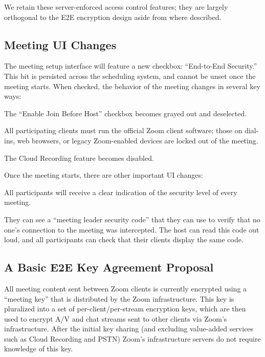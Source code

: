We retain these server-enforced access control features; they are largely orthogonal to the E2E encryption design aside from where described.

\subsection{Meeting UI Changes}

The meeting setup interface will feature a new checkbox: ``End-to-End Security.''  This bit is persisted across the scheduling system, and cannot be unset once the meeting starts. When checked, the behavior of the meeting changes in several key ways:

\begin{itemize*}
\item The ``Enable Join Before Host'' checkbox becomes grayed out and deselected.
\item All participating clients must run the official Zoom client software; those on dial-ins, web browsers, or legacy Zoom-enabled devices are locked out of the meeting.
\item The Cloud Recording feature becomes disabled.
\end{itemize*}

Once the meeting starts, there are other important UI changes:

\begin{itemize*}
\item All participants will receive a clear indication of the security level of every meeting.
\item They can see a ``meeting leader security code'' that they can use to verify that no one's connection to the meeting was intercepted. The host can read this code out loud, and all participants can check that their clients display the same code.


\end{itemize*}

\subsection{A Basic E2E Key Agreement Proposal}

All meeting content sent between Zoom clients is currently encrypted using a ``meeting key'' that is distributed by the Zoom infrastructure. This key is pluralized into a set of per-client/per-stream encryption keys, which are then used to encrypt A/V and chat streams sent to other clients via Zoom's infrastructure. After the initial key sharing (and excluding value-added services such as Cloud Recording and PSTN) Zoom's infrastructure servers do not require knowledge of this key.

